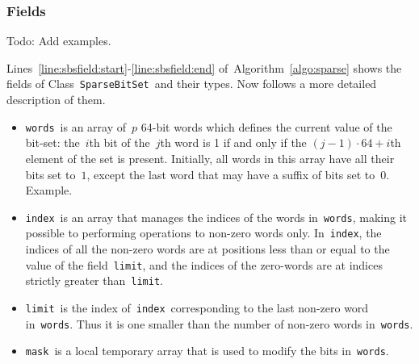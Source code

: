 \documentclass[a4paper,11pt]{article}
\newcommand{\Todo}[1]{{\color{blue}#1}}
\newcommand{\Algoref}[1]{Algorithm~\ref{#1}}
\newcommand{\Linesref}[2]{Lines~\ref{#1}-\ref{#2}}
\newcommand{\Words}{\texttt{words}}
\newcommand{\Index}{\texttt{index}}
\newcommand{\Mask}{\texttt{mask}}
\newcommand{\Limit}{\texttt{limit}}
\newcommand{\SparseBitSet}{\texttt{SparseBitSet}}
\numberwithin{equation}{section}
\begin{document}
\subsubsection{Fields}
\label{sbs:fields}

\Todo{Todo: Add examples.}

\Linesref{line:sbsfield:start}{line:sbsfield:end} of~\Algoref{algo:sparse} shows the fields
of Class~\SparseBitSet~and their types. Now follows a more detailed description of them.

\begin{itemize}
  \item \Words~is an array of~$p$ 64-bit words which defines the current value of the bit-set:
    the~$i$th bit of the~$j$th word is 1 if and only if the $(j-1) \cdot 64 + i$th element of
    the set is present. Initially, all words in this array have all their bits set to~$1$,
    except the last word that may have a suffix of bits set to~$0$. \Todo{Example.}

  \item \Index~is an array that manages the indices of the words in~\Words,
    making it possible to performing operations to non-zero words only.
    In~\Index, the
    indices of all the non-zero words are at positions less than or
    equal to the value of the field~\Limit, and the indices of the zero-words are
    at indices strictly greater than~\Limit. 

  \item \Limit~is the index of~\Index~corresponding to the last non-zero word in~\Words.
    Thus it is one smaller than the number of non-zero words in~\Words.

  \item \Mask~is a local temporary array that is used to modify the bits in~\Words.
    
\end{itemize}
\end{document}
